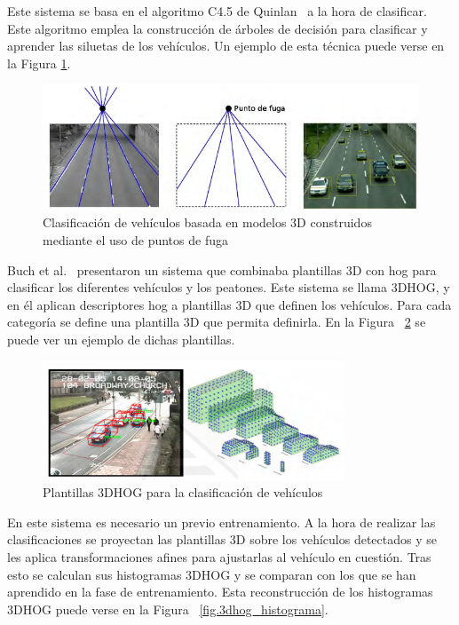 Este sistema se basa en el algoritmo C4.5 de Quinlan~\cite{c4_5} a la hora de clasificar. Este algoritmo emplea la construcción de árboles de decisión para clasificar y aprender las siluetas de los vehículos. Un ejemplo de esta técnica puede verse en la Figura \ref{fig.c4_5}.

\begin{figure}[H]
  \begin{center}
    \includegraphics[width=1\textwidth]{figures/Estado_arte/c4_5.png}
		\caption{Clasificación de vehículos basada en modelos 3D construidos mediante el uso de puntos de fuga}
		\label{fig.c4_5}
		\end{center}
\end{figure}

Buch et al.~\cite{3dhog_article} presentaron un sistema que combinaba plantillas 3D con \acrshort{hog} para clasificar los diferentes vehículos y los peatones. Este sistema se llama 3DHOG, y en él aplican descriptores \acrshort{hog} a plantillas 3D que definen los vehículos. Para cada categoría se define una plantilla 3D que permita definirla. En la Figura ~\ref{fig.3dhog} se puede ver un ejemplo de dichas plantillas.

\begin{figure}[H]
  \begin{center}
    \includegraphics[width=0.8\textwidth]{figures/Estado_arte/3dhog.png}
		\caption{Plantillas 3DHOG para la clasificación de vehículos}
		\label{fig.3dhog}
		\end{center}
\end{figure}

En este sistema es necesario un previo entrenamiento. A la hora de realizar las clasificaciones se proyectan las plantillas 3D sobre los vehículos detectados y se les aplica transformaciones afines para ajustarlas al vehículo en cuestión. Tras esto se calculan sus histogramas 3DHOG y se comparan con los que se han aprendido en la fase de entrenamiento. Esta reconstrucción de los histogramas 3DHOG puede verse en la Figura ~\ref{fig.3dhog_histograma}.

